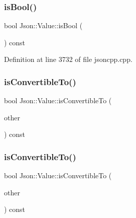 \hypertarget{class_json_1_1_value_ab1f02651cb89d0f18b63a036959391ba}{}\label{class_json_1_1_value_ab1f02651cb89d0f18b63a036959391ba} 
\subsubsection{\texorpdfstring{is\+Bool()}{isBool()}\hspace{0.1cm}{\footnotesize\ttfamily [2/2]}}
{\footnotesize\ttfamily bool Json\+::\+Value\+::is\+Bool (\begin{DoxyParamCaption}{ }\end{DoxyParamCaption}) const}



Definition at line 3732 of file jsoncpp.\+cpp.

\hypertarget{class_json_1_1_value_af1ee6be27a96a7d12128efdd60deb54d}{}\label{class_json_1_1_value_af1ee6be27a96a7d12128efdd60deb54d} 
\subsubsection{\texorpdfstring{is\+Convertible\+To()}{isConvertibleTo()}\hspace{0.1cm}{\footnotesize\ttfamily [1/2]}}
{\footnotesize\ttfamily bool Json\+::\+Value\+::is\+Convertible\+To (\begin{DoxyParamCaption}\item[{\hyperlink{namespace_json_a7d654b75c16a57007925868e38212b4e}{Value\+Type}}]{other }\end{DoxyParamCaption}) const}

\hypertarget{class_json_1_1_value_af1ee6be27a96a7d12128efdd60deb54d}{}\label{class_json_1_1_value_af1ee6be27a96a7d12128efdd60deb54d} 
\subsubsection{\texorpdfstring{is\+Convertible\+To()}{isConvertibleTo()}\hspace{0.1cm}{\footnotesize\ttfamily [2/2]}}
{\footnotesize\ttfamily bool Json\+::\+Value\+::is\+Convertible\+To (\begin{DoxyParamCaption}\item[{\hyperlink{namespace_json_a7d654b75c16a57007925868e38212b4e}{Value\+Type}}]{other }\end{DoxyParamCaption}) const}



